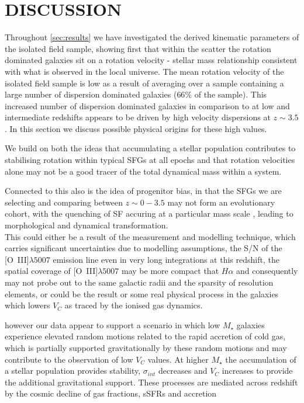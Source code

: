 \documentclass[fleqn,usenatbib]{mn2e}
\begin{document}
\section{DISCUSSION}\label{sec:discussion}

Throughout \cref{sec:results} we have investigated the derived kinematic parameters of the isolated field sample, showing first that within the scatter the rotation dominated galaxies sit on a rotation velocity - stellar mass relationship consistent with what is observed in the local universe.
The mean rotation velocity of the isolated field sample is low as a result of averaging over a sample containing a large number of dispersion dominated galaxies ($66\%$ of the sample).
This increased number of dispersion dominated galaxies in comparison to at low and intermediate redshifts appears to be driven by high velocity dispersions at $z\sim3.5$.
In this section we discuss possible physical origins for these high values.

We build on both the ideas that accumulating a stellar population contributes to stabilising rotation within typical SFGs at all epochs and that rotation velocities alone may not be a good tracer of the total dynamical mass within a system. 

Connected to this also is the idea of progenitor bias, in that the SFGs we are selecting and comparing between $z\sim0-3.5$ may not form an evolutionary cohort, with the quenching of SF accuring at a particular mass scale \citep[e.g.][]{Keres2005,Dekel2006,Peng2010}, leading to morphological and dynamical transformation. \\

This could either be a result of the measurement and modelling technique, which carries significant uncertainties due to modelling assumptions, the S/N of the [O~{\sc III}]$\lambda5007$ emission line even in very long integrations at this redshift, the spatial coverage of [O~{\sc III}]$\lambda5007$ may be more compact that $H\alpha$ and consequently may not probe out to the same galactic radii and the sparsity of resolution elements, or could be the result or some real physical process in the galaxies which lowers $V_{C}$ as traced by the ionised gas dynamics.

however our data appear to support a scenario in which low $M_{\star}$ galaxies experience elevated random motions related to the rapid accretion of cold gas, which is partially supported gravitationally by these random motions and may contribute to the observation of low $V_{C}$ values.
At higher $M_{\star}$ the accumulation of a stellar population provides stability, $\sigma_{int}$ decreases and $V_{C}$ increases to provide the additional gravitational support.
These processes are mediated across redshift by the cosmic decline of gas fractions, sSFRs and accretion \citep[e.g.][]{Wisnioski2015}
\end{document}

